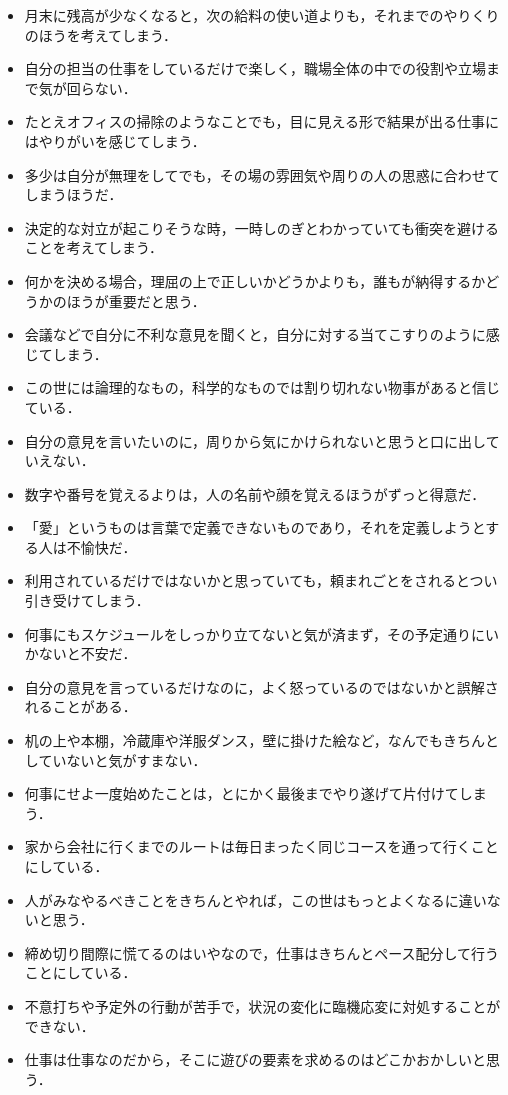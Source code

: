\begin{itemize}
\item 月末に残高が少なくなると，次の給料の使い道よりも，それまでのやりくりのほうを考えてしまう．
\item 自分の担当の仕事をしているだけで楽しく，職場全体の中での役割や立場まで気が回らない．
\item たとえオフィスの掃除のようなことでも，目に見える形で結果が出る仕事にはやりがいを感じてしまう．
\item 多少は自分が無理をしてでも，その場の雰囲気や周りの人の思惑に合わせてしまうほうだ．
\item 決定的な対立が起こりそうな時，一時しのぎとわかっていても衝突を避けることを考えてしまう．
\item 何かを決める場合，理屈の上で正しいかどうかよりも，誰もが納得するかどうかのほうが重要だと思う．
\item 会議などで自分に不利な意見を聞くと，自分に対する当てこすりのように感じてしまう．
\item この世には論理的なもの，科学的なものでは割り切れない物事があると信じている．
\item 自分の意見を言いたいのに，周りから気にかけられないと思うと口に出していえない．
\item 数字や番号を覚えるよりは，人の名前や顔を覚えるほうがずっと得意だ．
\item 「愛」というものは言葉で定義できないものであり，それを定義しようとする人は不愉快だ．
\item 利用されているだけではないかと思っていても，頼まれごとをされるとつい引き受けてしまう．
\item 何事にもスケジュールをしっかり立てないと気が済まず，その予定通りにいかないと不安だ．
\item 自分の意見を言っているだけなのに，よく怒っているのではないかと誤解されることがある．
\item 机の上や本棚，冷蔵庫や洋服ダンス，壁に掛けた絵など，なんでもきちんとしていないと気がすまない．
\item 何事にせよ一度始めたことは，とにかく最後までやり遂げて片付けてしまう．
\item 家から会社に行くまでのルートは毎日まったく同じコースを通って行くことにしている．
\item 人がみなやるべきことをきちんとやれば，この世はもっとよくなるに違いないと思う．
\item 締め切り間際に慌てるのはいやなので，仕事はきちんとペース配分して行うことにしている．
\item 不意打ちや予定外の行動が苦手で，状況の変化に臨機応変に対処することができない．
\item 仕事は仕事なのだから，そこに遊びの要素を求めるのはどこかおかしいと思う．
\end{itemize} 


